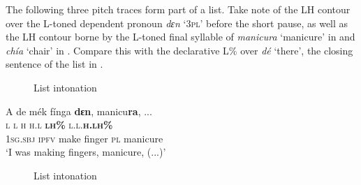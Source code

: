 The following three pitch traces form part of a list. Take note of the LH contour over the L-toned dependent pronoun \textit{dɛn} ‘\textsc{3pl}’ before the short pause, as well as the LH contour borne by the L-toned final syllable of \textit{manicura} ‘manicure’ in  and \textit{chía} ‘chair’ in . Compare this with the declarative L\% over \textit{dé} ‘there’, the closing sentence of the list in .


\begin{figure}
\caption{List intonation}
\label{fig:key:3.36}
\end{figure}


\ea%
    \label{ex:key:89}
    \glll   A    de  mék    fínga  \textbf{dɛn},    manicu\textbf{ra},  \op...\cp\\
\textsc{l}    \textsc{l}  \textsc{h}    \textsc{h.l}    \textbf{\textsc{lh\%}}    \textsc{l.l.}\textbf{\textsc{h.lh\%}}\\
\textsc{1sg.sbj}  \textsc{ipfv}  make  finger  \textsc{pl}    manicure\\
\glt ‘I was making fingers, manicure, (...)’
\z

\begin{figure}
\caption{List intonation}
\label{fig:key:3.37}
\end{figure}


